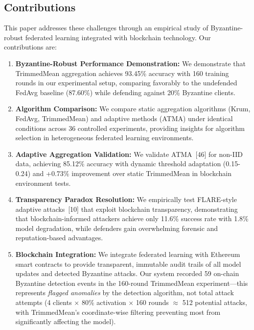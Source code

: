 \documentclass[12pt,a4paper,onecolumn]{article}
\begin{document}
\subsection{Contributions}

This paper addresses these challenges through an empirical study of Byzantine-robust federated learning integrated with blockchain technology. Our contributions are:

\begin{enumerate}
    \item \textbf{Byzantine-Robust Performance Demonstration:} We demonstrate that TrimmedMean aggregation achieves 93.45\% accuracy with 160 training rounds in our experimental setup, comparing favorably to the undefended FedAvg baseline (87.60\%) while defending against 20\% Byzantine clients.
    
    \item \textbf{Algorithm Comparison:} We compare static aggregation algorithms (Krum, FedAvg, TrimmedMean) and adaptive methods (ATMA) under identical conditions across 36 controlled experiments, providing insights for algorithm selection in heterogeneous federated learning environments.
    
    \item \textbf{Adaptive Aggregation Validation:} We validate ATMA~[46] for non-IID data, achieving 85.12\% accuracy with dynamic threshold adaptation (0.15-0.24) and +0.73\% improvement over static TrimmedMean in blockchain environment tests.
    
    \item \textbf{Transparency Paradox Resolution:} We empirically test FLARE-style adaptive attacks~[10] that exploit blockchain transparency, demonstrating that blockchain-informed attackers achieve only 11.6\% success rate with 1.8\% model degradation, while defenders gain overwhelming forensic and reputation-based advantages.
    
    \item \textbf{Blockchain Integration:} We integrate federated learning with Ethereum smart contracts to provide transparent, immutable audit trails of all model updates and detected Byzantine attacks. Our system recorded 59 on-chain Byzantine detection events in the 160-round TrimmedMean experiment---this represents \emph{flagged anomalies} by the detection algorithm, not total attack attempts (4 clients $\times$ 80\% activation $\times$ 160 rounds $\approx$ 512 potential attacks, with TrimmedMean's coordinate-wise filtering preventing most from significantly affecting the model).
    

\end{enumerate}
\end{document}
